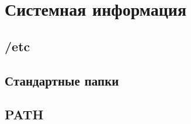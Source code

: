 \section{Системная информация}
\subsection{/etc}
\subsection{Стандартные папки}
\subsection{PATH}

\newpage